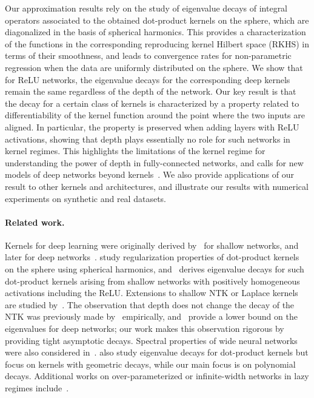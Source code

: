 Our approximation results rely on the study of eigenvalue decays of integral operators associated to the obtained dot-product kernels on the sphere, which are diagonalized in the basis of spherical harmonics.
This provides a characterization of the functions in the corresponding reproducing kernel Hilbert space (RKHS) in terms of their smoothness, and leads to convergence rates for non-parametric regression when the data are uniformly distributed on the sphere.
We show that for ReLU networks, the eigenvalue decays for the corresponding deep kernels remain the same regardless of the depth of the network.
Our key result is that the decay for a certain class of kernels is characterized by a property related to differentiability of the kernel function around the point where the two inputs are aligned.
In particular, the property is preserved when adding layers with ReLU activations, showing that depth plays essentially no role for such networks in kernel regimes.
This highlights the limitations of the kernel regime for understanding the power of depth in fully-connected networks, and calls for new models of deep networks beyond kernels~\citep[see, \eg,][for recent works in this direction]{allen2020backward,chen2020towards}.
We also provide applications of our result to other kernels and architectures, and illustrate our results with numerical experiments on synthetic and real datasets.



\paragraph{Related work.}
Kernels for deep learning were originally derived by~\citet{neal1996bayesian} for shallow networks, and later for deep networks~\citep{cho2009kernel,daniely2016toward,lee2018deep,matthews2018gaussian}.
\citet{smola2001regularization,minh2006mercer} study regularization properties of dot-product kernels on the sphere using spherical harmonics, and~\citet{bach2017breaking} derives eigenvalue decays for such dot-product kernels arising from shallow networks with positively homogeneous activations including the ReLU.
Extensions to shallow NTK or Laplace kernels are studied by~\citet{basri2019convergence,bietti2019inductive,geifman2020similarity}.
The observation that depth does not change the decay of the NTK was previously made by~\citet{basri2020frequency} empirically, and~\citet{geifman2020similarity} provide a lower bound on the eigenvalues for deep networks; our work makes this observation rigorous by providing tight asymptotic decays.
Spectral properties of wide neural networks were also considered in~\citep{cao2019towards,fan2020spectra,ghorbani2019linearized,xie2017diverse,yang2019fine}.
\citet{azevedo2014sharp,scetbon2020risk} also study eigenvalue decays for dot-product kernels but focus on kernels with geometric decays, while our main focus is on polynomial decays.
Additional works on over-parameterized or infinite-width networks in lazy regimes include~\citep{allen2019learning,allen2019convergence,arora2019exact,arora2019fine,brand2020training,lee2020generalized,song2019quadratic}.

